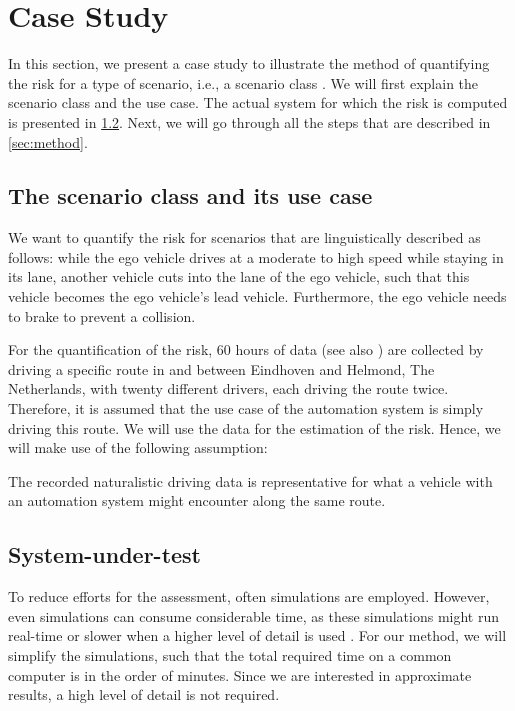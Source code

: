 \section{Case Study} %
\label{sec:example}

In this section, we present a case study to illustrate the method of quantifying the risk for a type of scenario, i.e., a scenario class \cite{elrofai2018scenario}. We will first explain the scenario class and the use case. The actual system for which the risk is computed is presented in \cref{sec:system}. Next, we will go through all the steps that are described in \cref{sec:method}.



\subsection{The scenario class and its use case}
\label{sec:scenario class}

We want to quantify the risk for scenarios that are linguistically described as follows: while the ego vehicle drives at a moderate to high speed while staying in its lane, another vehicle cuts into the lane of the ego vehicle, such that this vehicle becomes the ego vehicle's lead vehicle. Furthermore, the ego vehicle needs to brake to prevent a collision.

For the quantification of the risk, 60 hours of data (see also \cite{deGelder2017assessment}) are collected by driving a specific route in and between Eindhoven and Helmond, The Netherlands, with twenty different drivers, each driving the route twice. Therefore, it is assumed that the use case of the automation system is simply driving this route. We will use the data for the estimation of the risk. Hence, we will make use of the following assumption:
\begin{assumption}
	The recorded naturalistic driving data is representative for what a vehicle with an automation system might encounter along the same route.
\end{assumption}

\subsection{System-under-test}
\label{sec:system}

To reduce efforts for the assessment, often simulations are employed. However, even simulations can consume considerable time, as these simulations might run real-time \cite{shah2018airsim} or slower when a higher level of detail is used \cite{zofka2016testing}. For our method, we will simplify the simulations, such that the total required time on a common computer is in the order of minutes. Since we are interested in approximate results, a high level of detail is not required. 

